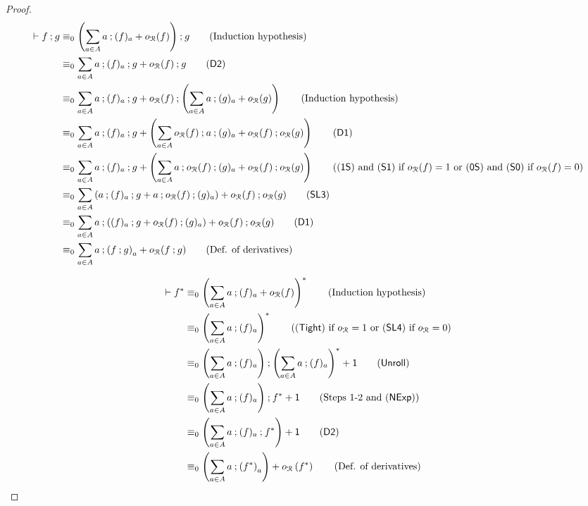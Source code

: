 \begin{proof}
    \begin{align*}
        \vdash f \seq g &\equiv_0 \left(\sum_{a \in \alphabet} a \seq (f)_a + o_{\mathcal{R}}(f)\right) \seq g \tag{Induction hypothesis} \\
        &\equiv_0 \sum_{a \in \alphabet} a \seq (f)_a \seq g  + o_{\mathcal{R}}(f) \seq g \tag{$\mathsf{D2}$} \\
        &\equiv_0 \sum_{a \in \alphabet} a \seq (f)_a \seq g  + o_{\mathcal{R}}(f) \seq \left(\sum_{a \in \alphabet} a \seq (g)_a + o_{\mathcal{R}}(g) \right) \tag{Induction hypothesis} \\
        &\equiv_0 \sum_{a \in \alphabet} a \seq (f)_a \seq g  +  \left(\sum_{a \in \alphabet}  o_{\mathcal{R}}(f) \seq a \seq (g)_a + o_{\mathcal{R}}(f) \seq o_{\mathcal{R}}(g) \right) \tag{$\mathsf{D1}$} \\
        &\equiv_0 \sum_{a \in \alphabet} a \seq (f)_a \seq g  +  \left(\sum_{a \in \alphabet} a \seq  o_{\mathcal{R}}(f) \seq (g)_a + o_{\mathcal{R}}(f) \seq o_{\mathcal{R}}(g) \right) \tag{($\mathsf{1S}$) and ($\mathsf{S1}$) if $o_{\mathcal{R}}(f)=1$ or ($\mathsf{0S}$) and ($\mathsf{S0}$) if $o_{\mathcal{R}}(f)=0$} \\
        &\equiv_0 \sum_{a \in \alphabet} \left(a \seq (f)_a \seq g  +  a \seq  o_{\mathcal{R}}(f) \seq (g)_a \right) + o_{\mathcal{R}}(f) \seq o_{\mathcal{R}}(g) \tag{$\mathsf{SL3}$}\\
        &\equiv_0 \sum_{a \in \alphabet} a \seq \left((f)_a \seq g  +  o_{\mathcal{R}}(f) \seq (g)_a \right) + o_{\mathcal{R}}(f) \seq o_{\mathcal{R}}(g) \tag{$\mathsf{D1}$}\\
        &\equiv_0 \sum_{a \in \alphabet} a \seq \left(f \seq g\right)_a + o_{\mathcal{R}}(f \seq g) \tag{Def. of derivatives}\\
    \end{align*}

    \begin{align*}
        \vdash f^{\ast} &\equiv_0 \left( \sum_{a \in \alphabet} a \seq (f)_a + o_{\mathcal{R}}(f)\right)^{\ast} \tag{Induction hypothesis}\\
        &\equiv_0 \left(\sum_{a \in \alphabet} a \seq (f)_a\right)^{\ast} \tag{($\mathsf{Tight}$) if $o_{\mathcal{R}}=1$ or ($\mathsf{SL4}$) if $o_{\mathcal{R}}=0$} \\
        &\equiv_0  \left(\sum_{a \in \alphabet} a \seq (f)_a\right) \seq  \left(\sum_{a \in \alphabet} a \seq (f)_a\right)^{\ast} + \one \tag{$\mathsf{Unroll}$}\\
        &\equiv_0  \left(\sum_{a \in \alphabet} a \seq (f)_a\right) \seq  f^{\ast} + \one \tag{Steps 1-2 and $(\Nexp)$} \\
        &\equiv_0 \left(\sum_{a \in \alphabet} a \seq (f)_a \seq  f^{\ast} \right)  + \one \tag{$\mathsf{D2}$}\\
        &\equiv_0 \left(\sum_{a \in \alphabet} a \seq \left(f^{\ast}\right)_a \right)  + o_{\mathcal{R}}\left(f^{\ast}\right) \tag{Def. of derivatives}\\
    \end{align*}
    
\end{proof}
